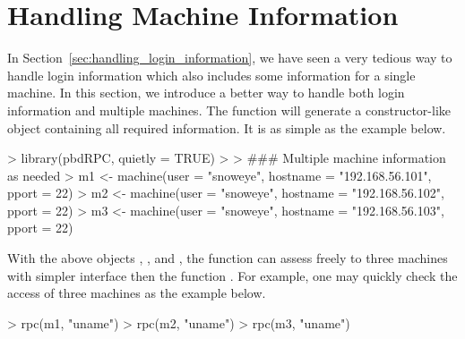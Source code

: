 \section[Handling Machine Information]{Handling Machine Information}
\label{sec:handling_machine_information}

In Section~\ref{sec:handling_login_information}, we have seen a very
tedious way to handle login information which also includes some
information for a single machine. In this section, we introduce a better way
to handle both login information and multiple machines.
The function  will generate a constructor-like object
containing all required information.
It is as simple as the example below.
\begin{Code}[title=Set machine information]
> library(pbdRPC, quietly = TRUE)
>
> ### Multiple machine information as needed
> m1 <- machine(user = "snoweye", hostname = "192.168.56.101", pport = 22)
> m2 <- machine(user = "snoweye", hostname = "192.168.56.102", pport = 22)
> m3 <- machine(user = "snoweye", hostname = "192.168.56.103", pport = 22)
\end{Code}

With the above objects , , and , the function
 can assess freely to three machines with simpler
interface then the function .
For example, one may quickly check the access of three machines as the
example below.
\begin{Code}[title=Basic \code{rpc()} in \pkg{pbdRPC} and \proglang{R}]
> rpc(m1, "uname")
> rpc(m2, "uname")
> rpc(m3, "uname")
\end{Code}

